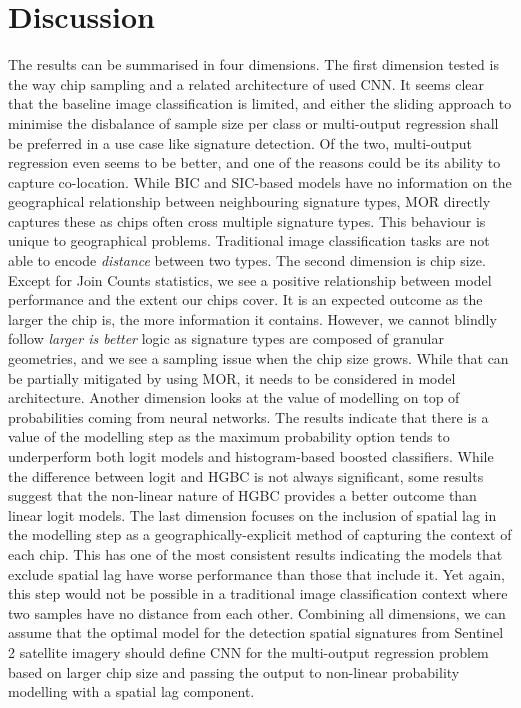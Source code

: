\section{Discussion}
\label{sec:discussion}


The results can be summarised in four dimensions.
The first dimension tested is the way chip sampling and a related architecture of used
CNN. It seems clear that the baseline image classification is limited, and either the
sliding approach to minimise the disbalance of sample size per class or multi-output
regression shall be preferred in a use case like signature detection. Of the two,
multi-output regression even seems to be better, and one of the reasons could be its
ability to capture co-location. While BIC and SIC-based models have no information on
the geographical relationship between neighbouring signature types, MOR directly
captures these as chips often cross multiple signature types. This behaviour is unique
to geographical problems. Traditional image classification tasks are not able to encode
\textit{distance} between two types.
The second dimension is chip size. Except for Join Counts statistics, we see a positive
relationship between model performance and the extent our chips cover. It is an expected
outcome as the larger the chip is, the more information it contains. However, we cannot
blindly follow \textit{larger is better} logic as signature types are composed of
granular geometries, and we see a sampling issue when the chip size grows. While that
can be partially mitigated by using MOR, it needs to be considered in model
architecture.
Another dimension looks at the value of modelling on top of probabilities coming from
neural networks. The results indicate that there is a value of the modelling step as the
maximum probability option tends to underperform both logit models and histogram-based
boosted classifiers. While the difference between logit and HGBC is not always
significant, some results suggest that the non-linear nature of HGBC provides a better
outcome than linear logit models.
The last dimension focuses on the inclusion of spatial lag in the modelling step as a
geographically-explicit method of capturing the context of each chip. This has one of
the most consistent results indicating the models that exclude spatial lag have worse
performance than those that include it. Yet again, this step would not be possible in a
traditional image classification context where two samples have no distance from each
other.
Combining all dimensions, we can assume that the optimal model for the detection spatial
signatures from Sentinel 2 satellite imagery should define CNN for the multi-output
regression problem based on larger chip size and passing the output to non-linear
probability modelling with a spatial lag component.


